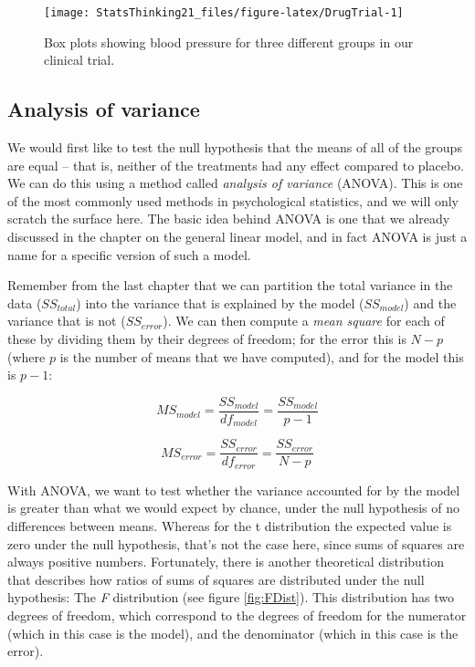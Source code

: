 \documentclass[
  12pt,
]{book}
\begin{document}
\begin{figure}
\texttt{[image: StatsThinking21\_files/figure-latex/DrugTrial-1]} \caption{Box plots showing blood pressure for three different groups in our clinical trial.}\label{fig:DrugTrial}
\end{figure}

\hypertarget{ANOVA}{%
\subsection{Analysis of variance}\label{ANOVA}}

We would first like to test the null hypothesis that the means of all of the groups are equal -- that is, neither of the treatments had any effect compared to placebo. We can do this using a method called \emph{analysis of variance} (ANOVA). This is one of the most commonly used methods in psychological statistics, and we will only scratch the surface here. The basic idea behind ANOVA is one that we already discussed in the chapter on the general linear model, and in fact ANOVA is just a name for a specific version of such a model.

Remember from the last chapter that we can partition the total variance in the data (\(SS_{total}\)) into the variance that is explained by the model (\(SS_{model}\)) and the variance that is not (\(SS_{error}\)). We can then compute a \emph{mean square} for each of these by dividing them by their degrees of freedom; for the error this is \(N - p\) (where \(p\) is the number of means that we have computed), and for the model this is \(p - 1\):

\[
MS_{model} =\frac{SS_{model}}{df_{model}}= \frac{SS_{model}}{p-1}
\]

\[
MS_{error} = \frac{SS_{error}}{df_{error}} = \frac{SS_{error}}{N - p}
\]

With ANOVA, we want to test whether the variance accounted for by the model is greater than what we would expect by chance, under the null hypothesis of no differences between means. Whereas for the t distribution the expected value is zero under the null hypothesis, that's not the case here, since sums of squares are always positive numbers. Fortunately, there is another theoretical distribution that describes how ratios of sums of squares are distributed under the null hypothesis: The \emph{F} distribution (see figure \ref{fig:FDist}). This distribution has two degrees of freedom, which correspond to the degrees of freedom for the numerator (which in this case is the model), and the denominator (which in this case is the error).
\end{document}
